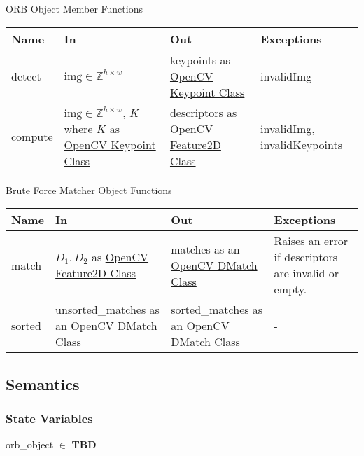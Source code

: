 \documentclass[12pt, titlepage]{article}
\begin{document}
ORB Object Member Functions
\begin{center}
  \begin{tabular}{p{4cm} p{4cm} p{5cm} p{3cm}}
  \hline
  \textbf{Name} & \textbf{In} & \textbf{Out} & \textbf{Exceptions} \\
  \hline
  detect & $\text{img} \in \mathbb{Z}^{h \times w}$ 
& keypoints as \href{https://docs.opencv.org/3.4/d2/d29/classcv_1_1KeyPoint.html}{OpenCV Keypoint Class} 
& invalidImg \\
\hline
compute & $\text{img} \in \mathbb{Z}^{h \times w}$, \newline 
$K$ where $K$ as \href{https://docs.opencv.org/3.4/d2/d29/classcv_1_1KeyPoint.html}{OpenCV Keypoint Class} 
& descriptors as \href{https://docs.opencv.org/4.x/d0/d13/classcv_1_1Feature2D.html}{OpenCV Feature2D Class} 
& invalidImg, \newline 
invalidKeypoints \\
  \hline
  \end{tabular}
\end{center}
Brute Force Matcher Object Functions
\begin{center}
  \begin{tabular}{p{3cm} p{4cm} p{5cm} p{3cm}}
  \hline
  \textbf{Name} & \textbf{In} & \textbf{Out} & \textbf{Exceptions} \\
  \hline
  match & $D_1, D_2$ as \href{https://docs.opencv.org/4.x/d0/d13/classcv_1_1Feature2D.html}{OpenCV Feature2D Class} 
  & matches as an \href{https://docs.opencv.org/3.4/d4/de0/classcv_1_1DMatch.html}{OpenCV DMatch Class} 
  & Raises an error if descriptors are invalid or empty. \\
  \hline
  sorted 
  & unsorted\_matches as an \href{https://docs.opencv.org/3.4/d4/de0/classcv_1_1DMatch.html}{OpenCV DMatch Class} 
  & sorted\_matches as an \href{https://docs.opencv.org/3.4/d4/de0/classcv_1_1DMatch.html}{OpenCV DMatch Class} & - \\
  \hline
  \end{tabular}
\end{center}

\subsection{Semantics}

\subsubsection{State Variables}
orb\_object $\in$ \textbf{TBD}
\end{document}
